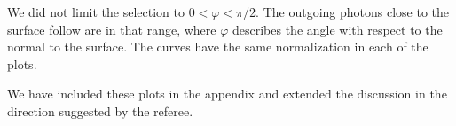 \documentclass[12pt]{article}
\begin{document}
We did not limit the selection to $0 < \varphi < \pi/2$. The outgoing
photons close to the surface follow are in that range, where $\varphi$
describes the angle with respect to the normal to the surface.  The
curves have the same normalization in each of the plots.  

We have included these plots in the appendix and extended the
discussion in the direction suggested by the referee. 
\end{document}
